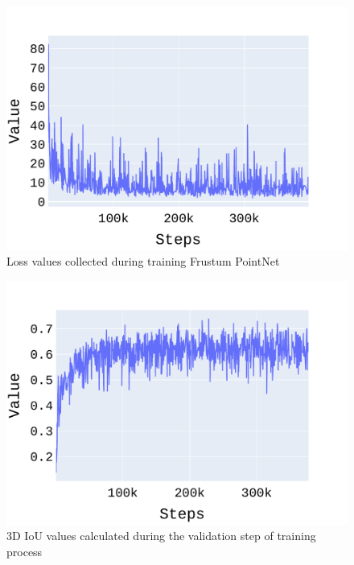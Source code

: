 \documentclass[10pt,twocolumn,letterpaper]{article}
\begin{document}
\begin{figure}[!htbp]
	\centering
	\includegraphics[scale = 0.4]{./images/LYFT_Detections/total_loss_1.pdf}
	\caption{Loss values collected during training Frustum PointNet}
	\label{fig:Loss_F-PointNet}
\end{figure}  

\begin{figure}[!htbp]
	\centering
	\includegraphics[scale = 0.4]{./images/LYFT_Detections/iou_3d.pdf}
	\caption{3D IoU values calculated during the validation step of training process}
	\label{fig:IoU_F-PointNet}
\end{figure}
 
\end{document}
